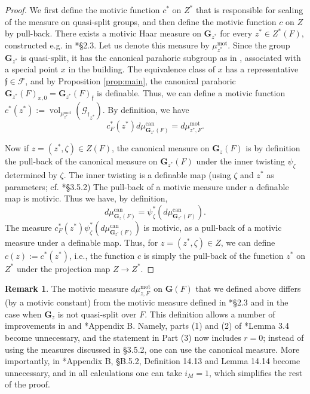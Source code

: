 \documentclass{amsart}
\newcommand{\cF}{\mathcal{F}}
\newcommand{\cG}{\mathcal{G}}
\DeclareMathOperator{\vol}{vol}
\newcommand{\bG}{\mathbf{G}}
\newcommand{\can}{\mathrm{can}}
\newcommand{\ff}{{\mathfrak f}}
\newcommand\mot{\mathrm{mot}}
\theoremstyle{plain}
\theoremstyle{definition}
\newtheorem{rem}[thm]{Remark}
\begin{document}
\begin{proof} 
We first define the motivic function $c^\ast$ on $Z^\ast$ that is responsible for scaling of the measure on quasi-split groups, and then define the motivic function $c$ on $Z$ by pull-back. 
There exists a motivic Haar measure on $\bG_{z^\ast}$ for every $z^\ast\in Z^\ast(F)$,
constructed e.g. in \cite{gordon-hales:15a}*{\S 2.3}. Let us denote this measure by $\mu_{z^\ast}^\mot$. 
Since the group $\bG_{z^\ast}$ is quasi-split,   
it has the canonical parahoric subgroup as in \cite{gross:97a}, associated with a special point $x$ in the building. The equivalence class of $x$ has a representative $\ff\in \cF$, and by Proposition \ref{prop:main}, the canonical parahoric 
$\bG_{z^\ast}(F)_{x, 0}=\bG_{z^\ast}(F)_\ff$ is definable.  Thus, we can define  a motivic function $c^\ast(z^\ast):=
\vol_{\mu_{z^\ast}^\mot}({\cG_{\ff}}_{z^\ast})$. 
By definition, we have 
\[
c^\ast_F(z^\ast) d\mu_{\bG_{z^\ast}(F)}^\can = d\mu_{z^\ast, F}^\mot.
\]

Now if $z=(z^\ast, \zeta)\in Z(F)$, the canonical measure on $\bG_z(F)$ is by definition the pull-back of the canonical measure on $\bG_{z^\ast}(F)$ under the inner twisting $\psi_{\zeta}$ determined by $\zeta$. 
The inner twisting is a definable map
(using $\zeta$ and $z^\ast$ as parameters; cf. \cite{cluckers-gordon-halupczok:14b}*{\S 3.5.2}) 
The pull-back of a motivic measure under a definable map is motivic.
Thus we have, by definition, 
$$ %
d\mu_{\bG_{z}(F)}^\can  =  
\psi_{\zeta}^\ast \left(d\mu_{\bG_{z^\ast}(F)}^\can \right).$$ 
The measure $c^\ast_F(z^\ast)\psi_{\zeta}^\ast \left(d\mu_{\bG_{z^\ast}(F)}^\can \right)$ is motivic, as a pull-back of a motivic measure under a definable map. 
Thus, for $z=(z^\ast, \zeta)\in Z$, we can define $c(z):= c^\ast(z^\ast)$, i.e., 
the function $c$ is simply the pull-back of the function $z^\ast$ on $Z^\ast$ under the projection map $Z\to Z^\ast$. 
\end{proof}

\begin{rem} The motivic measure $d\mu_{z, F}^\mot$ on $\bG(F)$ that we defined above differs (by a motivic constant) from the 
motivic measure defined in \cite{gordon-hales:15a}*{\S 2.3} and  \cite{cluckers-gordon-halupczok:14b} in the case when $\bG_z$ is not quasi-split over $F$. 
This definition allows a number of improvements in \cite{cluckers-gordon-halupczok:14b} and 
\cite{shin-templier:15a}*{Appendix B}. 
Namely,  parts (1) and (2) of \cite{cluckers-gordon-halupczok:14b}*{Lemma 3.4} become unnecessary, and the statement in Part (3)
now includes $r=0$; instead of using the measures discussed in \S 3.5.2, one can use the canonical measure. 
More importantly, in \cite{shin-templier:15a}*{Appendix B, \S B.5.2}, Definition 14.13 and Lemma 14.14
become unnecessary, and in all calculations one can take $i_M=1$, which simplifies the rest of the proof.
\end{rem}
\end{document}

